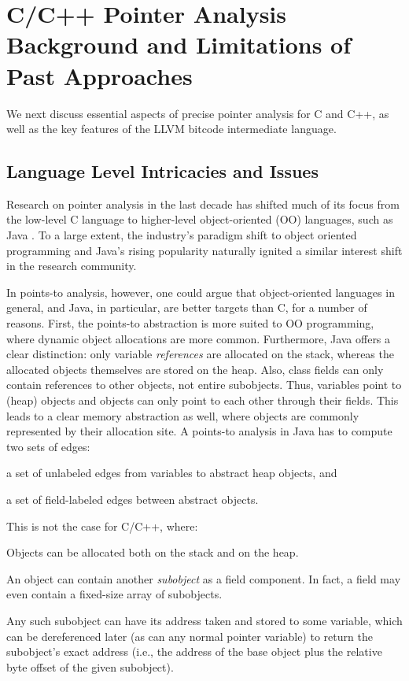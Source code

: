 \section{C/C++ Pointer Analysis Background and Limitations of Past
  Approaches}
\label{structsens/sect/background}

We next discuss essential aspects of precise pointer analysis for
C and C++, as well as the key features of the LLVM bitcode intermediate
language.

\subsection{Language Level Intricacies and Issues}

Research on pointer analysis in the last decade has shifted much of
its focus from the low-level C language to higher-level
object-oriented (OO) languages, such as Java
\cite{pldi/BerndlLQHU03,oopsla/BravenboerS09,issta/MilanovaRR02,oopsla/RountevMR01,oopsla/WhaleyR99}.
To a large extent, the industry's paradigm shift to object oriented
programming and Java's rising popularity naturally ignited a similar
interest shift in the research community. 

In points-to analysis, however, one could argue that
object-oriented languages in general, and Java, in particular, are
better targets than C, for a number of reasons.  First, the
points-to abstraction \cite{pldi/EmamiGH94} is  more suited to OO
programming, where dynamic object allocations are more
common. Furthermore, Java offers a clear distinction: only variable
\emph{references} are allocated on the stack, whereas the allocated
objects themselves are stored on the heap. Also, class fields can only
contain references to other objects, not entire subobjects. Thus, variables point to (heap)
objects and objects can only point to each other through their
fields. This leads to a clear memory abstraction as well, where
objects are commonly represented by their allocation site. A points-to
analysis in Java has to compute two sets of edges:
\begin{inparaenum}[(i)]
\item a set of unlabeled edges from variables to abstract heap
  objects, and
\item a set of field-labeled edges between abstract objects.
\end{inparaenum}

This is not the case for C/C++, where:
\begin{compactenum}
\item Objects can be allocated both on the stack and on the heap.
\item An object can contain another \emph{subobject} as a field
  component. In fact, a field may even contain a fixed-size array of
  subobjects.
\item Any such subobject can have its address taken and stored to some
  variable, which can be dereferenced later (as can any normal pointer
  variable) to return the subobject's exact address (i.e., the address
  of the base object plus the relative byte offset of the given
  subobject).
\end{compactenum}



